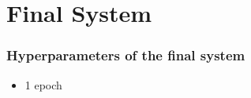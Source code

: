 \section{Final System}

\begin{frame}
	\frametitle{Hyperparameters of the final system}
	\begin{itemize}
		\item 1 epoch
	\end{itemize}
\end{frame}